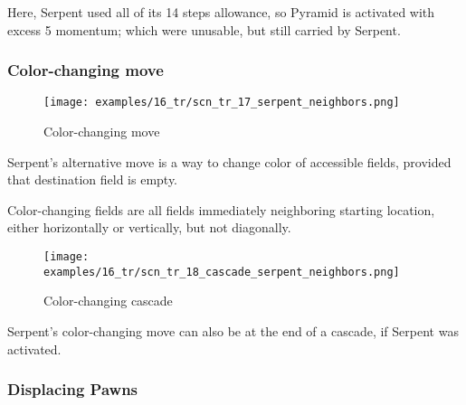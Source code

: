 Here, Serpent used all of its 14 steps allowance, so Pyramid is activated with
excess 5 momentum; which were unusable, but still carried by Serpent.

\clearpage %

\subsubsection*{Color-changing move}
\label{sec:Tamoanchan Revisited/Serpent/Movement/Color-changing move}

\noindent
\begin{minipage}{\textwidth}
\begin{wrapfigure}[9]{l}{0.4\textwidth}
\centering
\texttt{[image: examples/16\_tr/scn\_tr\_17\_serpent\_neighbors.png]}
\caption{Color-changing move}
\label{fig:scn_tr_17_serpent_neighbors}
\end{wrapfigure}
Serpent's alternative move is a way to change color of accessible fields,
provided that destination field is empty.

\mbox{}\newline %
Color-changing fields are all fields immediately neighboring starting
location, either horizontally or vertically, but not diagonally.
\end{minipage}

\vspace*{2.9\baselineskip}
\noindent
\begin{minipage}{\textwidth}
\begin{wrapfigure}[3]{l}{0.4\textwidth}
\centering
\texttt{[image: examples/16\_tr/scn\_tr\_18\_cascade\_serpent\_neighbors.png]}
\caption{Color-changing cascade}
\label{fig:scn_tr_18_cascade_serpent_neighbors}
\end{wrapfigure}
Serpent's color-changing move can also be at the end of a cascade,
if Serpent was activated.
\end{minipage}

\clearpage %

\subsubsection*{Displacing Pawns}
\label{sec:Tamoanchan Revisited/Serpent/Movement/Displacing Pawns}

